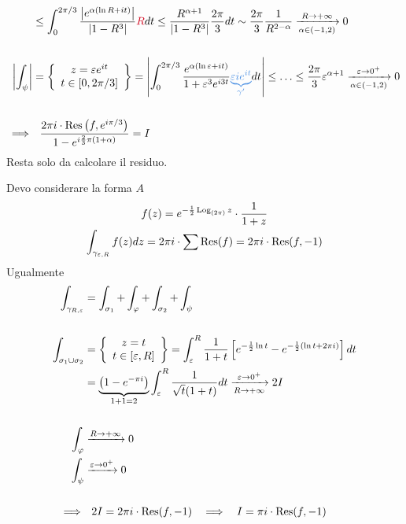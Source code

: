 \begin{equation*}
\begin{aligned}
 & \leq \int ^{2\pi /3}_{0}\frac{\left| e^{\alpha (\ln R + it)}\right| }{\left| 1 - R^{3}\right| }\textcolor[rgb]{0.82,0.01,0.11}{R} dt\leq \frac{R^{\alpha + 1}}{\left| 1 - R^{3}\right| }\frac{2\pi }{3} dt\sim \frac{2\pi }{3}\frac{1}{R^{2 - \alpha }}\xrightarrow[\alpha \in (- 1,2)]{R\rightarrow + \infty } 0\\
 & \\
\left| \int _{\psi }\right|  & = \left\{\begin{array}{ c }
z = \varepsilon e^{it}\\
t\in [ 0,2\pi /3]
\end{array}\right\} = \left| \int ^{2\pi /3}_{0}\frac{e^{\alpha (\ln \varepsilon + it)}}{1 + \varepsilon ^{3} e^{i3t}}\textcolor[rgb]{0.29,0.56,0.89}{\underbrace{\varepsilon ie^{it}}_{\gamma '}} dt\right| \leq \dotsc \leq \frac{2\pi }{3} \varepsilon ^{\alpha + 1}\xrightarrow[\alpha \in (- 1,2)]{\varepsilon \rightarrow 0^{ + }} 0\\
 & \\
\implies  & \ \ \frac{2\pi i\cdot \Res \left(f,e^{i\pi /3}\right)}{1 - e^{i\frac{2}{3} \pi (1 + \alpha)}} = I
\end{aligned}
\end{equation*}
Resta solo da calcolare il residuo.
\Soluzione

Devo considerare la forma $A$
\begin{gather*}
f(z) = e^{ - \frac{1}{2}\operatorname{Log}_{(2\pi)} z} \cdot \frac{1}{1 + z}\\
\int _{\gamma _{\varepsilon ,R}} f(z) dz = 2\pi i\cdot \sum \operatorname{Res} (f) = 2\pi i\cdot \operatorname{Res} (f, - 1)
\end{gather*}
Ugualmente
\begin{equation*}
\begin{aligned}
\int _{\gamma _{R,\varepsilon }} & = \int _{\sigma _{1}} + \int _{\varphi } + \int _{\sigma _{2}} + \int _{\psi }\\
 & \\
\int _{\sigma _{1} \cup \sigma _{2}} & = \left\{\begin{array}{ c }
z = t\\
t\in [ \varepsilon ,R]
\end{array}\right\} = \int ^{R}_{\varepsilon }\frac{1}{1 + t}\left[ e^{ - \frac{1}{2}\ln t} - e^{ - \frac{1}{2}(\ln t + 2\pi i)}\right] dt\\
 & = \underbrace{\left(1 - e^{ - \pi i}\right)}_{1 + 1 = 2}\int ^{R}_{\varepsilon }\frac{1}{\sqrt{t}(1 + t)} dt\xrightarrow[R\rightarrow + \infty ]{\varepsilon \rightarrow 0^{ + }} 2I\\
 & \\
\int _{\varphi } & \xrightarrow{R\rightarrow + \infty } 0\\
\int _{\psi } & \xrightarrow{\varepsilon \rightarrow 0^{ + }} 0\\
 & \\
\implies  & \ \ 2I = 2\pi i\cdot \operatorname{Res} (f, - 1) \ \ \implies \ \ I = \pi i\cdot \operatorname{Res} (f, - 1)
\end{aligned}
\end{equation*}
\Soluzione

